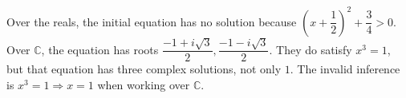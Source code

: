 Over the reals, the initial equation has no solution because $(x+\dfrac{1}{2})^2+\dfrac{3}{4}>0$. Over $\mathbb C$, the equation has roots $\boxed{\dfrac{-1+i\sqrt3}{2},\dfrac{-1-i\sqrt3}{2}}$. They do satisfy $x^3=1$, but that equation has three complex solutions, not only $1$. The invalid inference is $x^3=1\Rightarrow x=1$ when working over $\mathbb C$.
